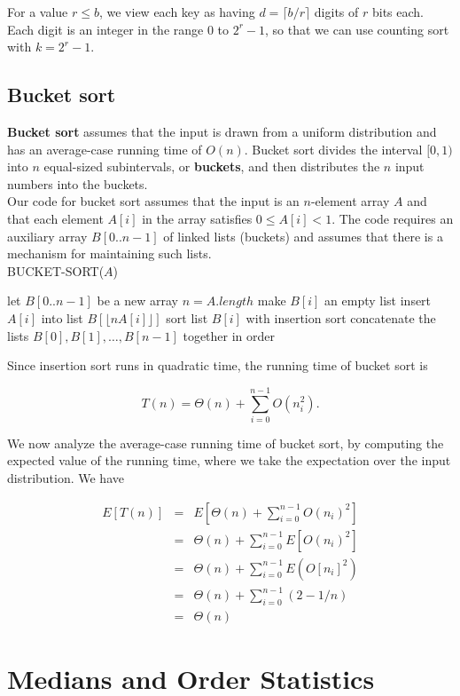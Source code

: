 \documentclass[12pt]{article}
\begin{document}
For a value $r \le b$, we view each key as having $d = \lceil b/r \rceil$ digits of $r$ bits each. Each digit is an integer in the range $0$ to $2^r-1$, so that we can use counting sort with $k = 2^r -1$.

\subsection{Bucket sort}

\textbf {Bucket sort} assumes that the input is drawn from a uniform distribution and has an average-case running time of $O(n)$. Bucket sort divides the interval $[0,1)$ into $n$ equal-sized subintervals, or \textbf {buckets}, and then distributes the $n$ input numbers into the buckets. \\

Our code for bucket sort assumes that the input is an $n$-element array $A$ and that each element $A[i]$ in the array satisfies $0 \le A[i] < 1$. The code requires an auxiliary array $B[0..n-1]$ of linked lists (buckets) and assumes that there is a mechanism for maintaining such lists. \\

BUCKET-SORT($A$)
\begin{algorithmic}[1]
\State let $B[0..n-1]$ be a new array
\State $n = A.length$
	\State make $B[i]$ an empty list
\EndFor
{}
	\State insert $A[i]$ into list $B[\lfloor nA[i] \rfloor ]$
\EndFor
{}
	\State sort list $B[i]$ with insertion sort
\EndFor
\State concatenate the lists $B[0], B[1], \dots, B[n-1]$ together in order
\end{algorithmic}

Since insertion sort runs in quadratic time, the running time of bucket sort is

\begin{equation*}
  T(n) = \Theta(n) + \sum_{i=0}^{n-1} O(n_i^2).
\end{equation*}

We now analyze the average-case running time of bucket sort, by computing the expected value of the running time, where we take the expectation over the input distribution. We have

\begin{eqnarray*}
  E[T(n)]
  &=& E \left[ \Theta (n) + \sum_{i=0}^{n-1} O(n_i)^2 \right] \\
  &=& \Theta (n) + \sum_{i=0}^{n-1} E \left[ O(n_i)^2 \right] \\
  &=& \Theta (n) + \sum_{i=0}^{n-1} E \left( O[n_i]^2 \right) \\
  &=& \Theta (n) + \sum_{i=0}^{n-1} (2 - 1/n) \\
  &=& \Theta (n)
\end{eqnarray*}

\section{Medians and Order Statistics}
\end{document}
